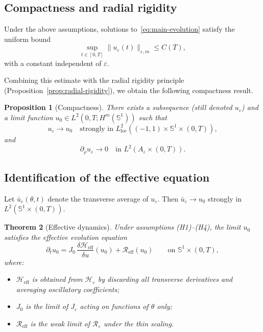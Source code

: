 \documentclass[11pt]{amsart}
\theoremstyle{plain}
\newtheorem{theorem}{Theorem}[section]
\newtheorem{proposition}[theorem]{Proposition}
\theoremstyle{definition}
\theoremstyle{remark}
\theoremstyle{remark}
\begin{document}
\subsection{Compactness and radial rigidity}

Under the above assumptions, solutions to~\eqref{eq:main-evolution} satisfy the
uniform bound
\[
\sup_{t\in[0,T]}
\|u_\varepsilon(t)\|_{\varepsilon,m}
\le C(T),
\]
with a constant independent of $\varepsilon$.

Combining this estimate with the radial rigidity principle
(Proposition~\ref{prop:radial-rigidity}), we obtain the following compactness
result.

\begin{proposition}[Compactness]
\label{prop:compactness}
There exists a subsequence (still denoted $u_\varepsilon$) and a limit function
$u_0\in L^2(0,T;H^m(\mathbb S^1))$ such that
\[
u_\varepsilon \longrightarrow u_0
\quad\text{strongly in }L^2_{\mathrm{loc}}((-1,1)\times\mathbb S^1\times(0,T)),
\]
and
\[
\partial_\rho u_\varepsilon \longrightarrow 0
\quad\text{in }L^2(A_\varepsilon\times(0,T)).
\]
\end{proposition}

\subsection{Identification of the effective equation}

Let $\bar u_\varepsilon(\theta,t)$ denote the transverse average of $u_\varepsilon$.
Then $\bar u_\varepsilon\to u_0$ strongly in $L^2(\mathbb S^1\times(0,T))$.

\begin{theorem}[Effective dynamics]
\label{thm:effective-dynamics}
Under assumptions {\rm(H1)--(H4)}, the limit $u_0$ satisfies the effective
evolution equation
\begin{equation}
\label{eq:effective}
\partial_t u_0
=
J_0\,\frac{\delta\mathcal H_{\mathrm{eff}}}{\delta u}(u_0)
+
\mathcal R_{\mathrm{eff}}(u_0)
\qquad\text{on }\mathbb S^1\times(0,T),
\end{equation}
where:
\begin{itemize}
\item $\mathcal H_{\mathrm{eff}}$ is obtained from $\mathcal H_\varepsilon$ by
discarding all transverse derivatives and averaging oscillatory coefficients;
\item $J_0$ is the limit of $J_\varepsilon$ acting on functions of $\theta$ only;
\item $\mathcal R_{\mathrm{eff}}$ is the weak limit of $\mathcal R_\varepsilon$
under the thin scaling.
\end{itemize}
\end{theorem}
\end{document}

